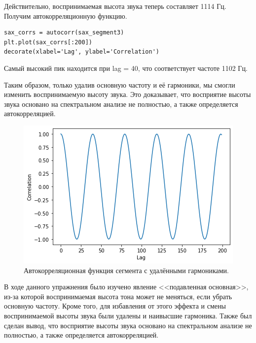 \documentclass[a4paper, 14pt]{extarticle}
\begin{document}
    Действительно, воспринимаемая высота звука теперь составляет 1114 Гц. Получим автокорреляционную функцию.

    \begin{lstlisting}[caption= Получение автокорреляционной функции., label={lst:task4_autocorr_without_harmonics}]
sax_corrs = autocorr(sax_segment3)
plt.plot(sax_corrs[:200])
decorate(xlabel='Lag', ylabel='Correlation')
    \end{lstlisting}

    Самый высокий пик находится при lag = 40, что соответствует частоте 1102 Гц.

    Таким образом, только удалив основную частоту и её гармоники, мы смогли изменить воспринимаемую высоту звука.
    Это доказывает, что восприятие высоты звука основано на спектральном анализе не полностью, а также определяется
    автокорреляцией.

    \begin{figure}[H]
        \centering
        \includegraphics[width=0.8\linewidth]{resources/Images/task4_autocorr_without_harmonics}
        \caption{Автокорреляционная функция сегмента с удалёнными гармониками.}
        \label{fig:task4_autocorr_without_harmonics}
    \end{figure}

    В ходе данного упражнения было изучено явление <<подавленная основная>>, из-за которой воспринимаемая высота тона
    может не меняться, если убрать основную частоту. Кроме того, для избавления от этого эффекта и смены воспринимаемой
    высоты звука были удалены и наивысшие гармоника. Также был сделан вывод, что восприятие высоты звука основано на
    спектральном анализе не полностью, а также определяется автокорреляцией.

    \newpage

\end{document}
